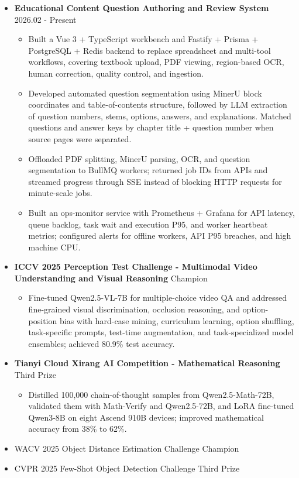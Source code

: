 \documentclass{resume}
\begin{document}
\newpage
{}
\begin{itemize}
  \item \textbf{Educational Content Question Authoring and Review System} \hfill 2026.02 - Present
  \begin{itemize}
    \item Built a Vue 3 + TypeScript workbench and Fastify + Prisma + PostgreSQL + Redis backend to replace spreadsheet and multi-tool workflows, covering textbook upload, PDF viewing, region-based OCR, human correction, quality control, and ingestion.
    \item Developed automated question segmentation using MinerU block coordinates and table-of-contents structure, followed by LLM extraction of question numbers, stems, options, answers, and explanations. Matched questions and answer keys by chapter title + question number when source pages were separated.
    \item Offloaded PDF splitting, MinerU parsing, OCR, and question segmentation to BullMQ workers; returned job IDs from APIs and streamed progress through SSE instead of blocking HTTP requests for minute-scale jobs.
    \item Built an ops-monitor service with Prometheus + Grafana for API latency, queue backlog, task wait and execution P95, and worker heartbeat metrics; configured alerts for offline workers, API P95 breaches, and high machine CPU.
  \end{itemize}
\end{itemize}

\begin{itemize}
  \item \textbf{ICCV 2025 Perception Test Challenge - Multimodal Video Understanding and Visual Reasoning} \hfill Champion
  \begin{itemize}
    \item Fine-tuned Qwen2.5-VL-7B for multiple-choice video QA and addressed fine-grained visual discrimination, occlusion reasoning, and option-position bias with hard-case mining, curriculum learning, option shuffling, task-specific prompts, test-time augmentation, and task-specialized model ensembles; achieved 80.9\% test accuracy.
  \end{itemize}

  \item \textbf{Tianyi Cloud Xirang AI Competition - Mathematical Reasoning} \hfill Third Prize
  \begin{itemize}
    \item Distilled 100,000 chain-of-thought samples from Qwen2.5-Math-72B, validated them with Math-Verify and Qwen2.5-72B, and LoRA fine-tuned Qwen3-8B on eight Ascend 910B devices; improved mathematical accuracy from 38\% to 62\%.
  \end{itemize}
  \item WACV 2025 Object Distance Estimation Challenge \hfill Champion
  \item CVPR 2025 Few-Shot Object Detection Challenge \hfill Third Prize
\end{itemize}
\end{document}
